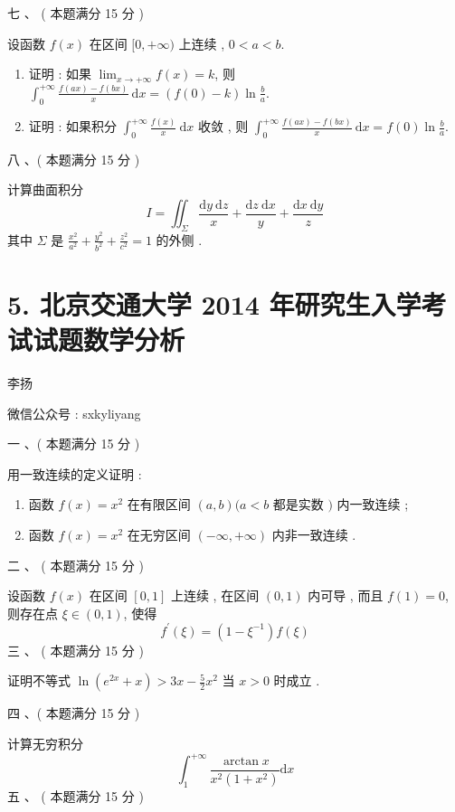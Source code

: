 \documentclass[10pt]{article}
\begin{document}
{ 七 、 ( 本题满分  15  分 )

 设函数  $f(x)$  在区间  $[0,+\infty)$  上连续 , $0<a<b$.

\begin{enumerate}
  \item  证明 :  如果  $\lim _{x \rightarrow+\infty} f(x)=k$,  则  $\int_{0}^{+\infty} \frac{f(a x)-f(b x)}{x} \mathrm{~d} x=(f(0)-k) \ln \frac{b}{a}$.

  \item  证明 :  如果积分  $\int_{0}^{+\infty} \frac{f(x)}{x} \mathrm{~d} x$  收敛 ,  则  $\int_{0}^{+\infty} \frac{f(a x)-f(b x)}{x} \mathrm{~d} x=f(0) \ln \frac{b}{a}$.

\end{enumerate}
 八 、( 本题满分  15  分 )

 计算曲面积分 
$$
I=\iint_{\Sigma} \frac{\mathrm{d} y \mathrm{~d} z}{x}+\frac{\mathrm{d} z \mathrm{~d} x}{y}+\frac{\mathrm{d} x \mathrm{~d} y}{z}
$$
 其中  $\Sigma$  是  $\frac{x^{2}}{a^{2}}+\frac{y^{2}}{b^{2}}+\frac{z^{2}}{c^{2}}=1$  的外侧 .

\section{5. 北京交通大学 2014 年研究生入学考试试题数学分析}
 李扬 

 微信公众号 : sxkyliyang

 一 、( 本题满分  15  分 )

 用一致连续的定义证明 :

\begin{enumerate}
  \item  函数  $f(x)=x^{2}$  在有限区间  $(a, b)(a<b$  都是实数  $)$  内一致连续 ;

  \item  函数  $f(x)=x^{2}$  在无穷区间  $(-\infty,+\infty)$  内非一致连续 .

\end{enumerate}
 二 、 ( 本题满分  15  分 )

 设函数  $f(x)$  在区间  $[0,1]$  上连续 ,  在区间  $(0,1)$  内可导 ,  而且  $f(1)=0$,  则存在点  $\xi \in(0,1)$,  使得 
$$
f^{\prime}(\xi)=\left(1-\xi^{-1}\right) f(\xi)
$$
 三 、 ( 本题满分  15  分 )

 证明不等式  $\ln \left(e^{2 x}+x\right)>3 x-\frac{5}{2} x^{2}$  当  $x>0$  时成立 .

 四 、( 本题满分  15  分 )

 计算无穷积分 
$$
\int_{1}^{+\infty} \frac{\arctan x}{x^{2}\left(1+x^{2}\right)} \mathrm{d} x
$$
 五 、 ( 本题满分  15  分 )

}
\end{document}
